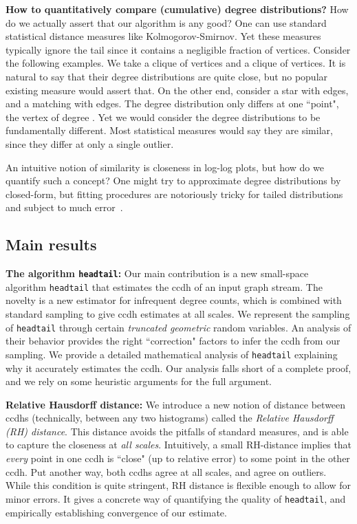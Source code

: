 \documentclass[11pt]{article}
\theoremstyle{definition}
\newcommand{\degdist}{{\tt headtail}}
\begin{document}
\textbf{How to quantitatively compare (cumulative) degree distributions?} How do we actually assert that our algorithm
is any good?
One can use standard statistical distance measures like Kolmogorov-Smirnov.
Yet these measures typically ignore
the tail since it contains a negligible fraction of vertices. Consider the following examples. We take a clique
of  vertices and a clique of  vertices. It is natural to say that their degree distributions are quite close,
but no popular existing measure would assert that. On the other end, consider a star with  edges, and a matching with 
edges. The degree distribution only differs at one ``point", the vertex of degree . Yet we would consider
the degree distributions to be fundamentally different. Most statistical measures would say they are similar, since
they differ at only a single outlier.

An intuitive notion of similarity is closeness in log-log plots, but how do we quantify such a concept? One might
try to approximate degree distributions by closed-form, but fitting procedures are notoriously tricky
for tailed distributions and subject to much error~\cite{ClShNe09}.

\subsection{Main results}


\textbf{The algorithm \degdist:} Our main contribution is a new small-space algorithm \degdist{} that estimates
the ccdh of an input graph stream. The novelty is a new estimator for infrequent
degree counts, which is combined with standard sampling to give
ccdh estimates at all scales. We represent the sampling of \degdist{} through certain \emph{truncated geometric}
random variables. An analysis of their behavior provides the right ``correction" factors
to infer the ccdh from our sampling.
We provide a detailed mathematical analysis of \degdist{} explaining why it accurately
estimates the ccdh. Our analysis falls short of a complete proof, and we rely
on some heuristic arguments for the full argument.

\textbf{Relative Hausdorff distance:} We introduce a new notion of distance between
ccdhs (technically, between any two histograms) called the \emph{Relative Hausdorff (RH) distance}.
This distance avoids the pitfalls of standard measures, and is able to capture the closeness
at \emph{all scales}. Intuitively, a small RH-distance implies that \emph{every} point in one ccdh
is ``close" (up to relative error) to some point in the other ccdh. Put another way, both ccdhs
agree at all scales, and agree on outliers. While this condition is quite stringent, RH distance
is flexible enough to allow for minor errors. It gives a concrete way of quantifying the quality
of \degdist, and empirically establishing convergence of our estimate.
\end{document}

